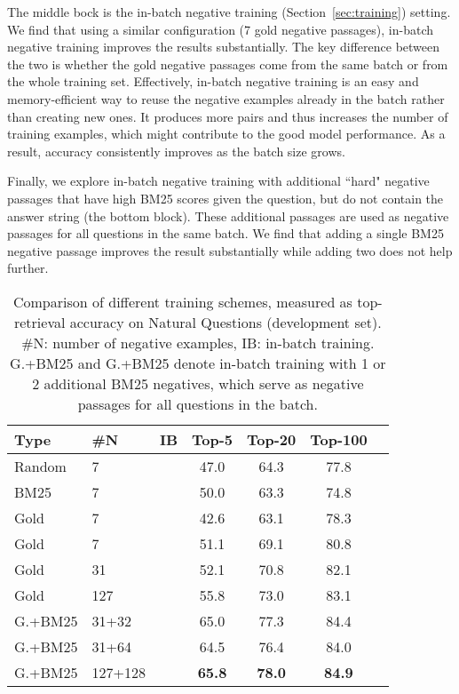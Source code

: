 \documentclass[11pt,a4paper]{article}
\newcommand\tf[1]{\textbf{#1}}
\begin{document}
The middle bock is the in-batch negative training (Section~\ref{sec:training}) setting.
We find that using a similar configuration (7 gold negative passages), in-batch negative training improves the results substantially.
The key difference between the two is whether the gold negative passages come from the same batch or from the whole training set.
Effectively, in-batch negative training is an easy and memory-efficient way to reuse the negative examples already in the batch rather than creating new ones.
It produces more pairs and thus increases the number of training examples, which might contribute to the good model performance. 
As a result, accuracy consistently improves as the batch size grows.

Finally, we explore in-batch negative training with additional ``hard" negative passages that have high BM25 scores given the question, but do not contain the answer string (the bottom block). These additional passages are used as negative passages for all questions in the same batch.
We find that adding a single BM25 negative passage improves the result substantially while adding two does not help further.


\begin{table}[t]
    \centering
    \small
    \begingroup
    \setlength{\tabcolsep}{0.70\tabcolsep}
    \begin{tabular}{@{}l l c cc c c @{}} \toprule
    \tf{Type} & \tf{\#N} & \tf{IB} & \tf{Top-5} & \tf{Top-20} & \tf{Top-100} \\ \midrule
    Random & 7 &  & 47.0 & 64.3 & 77.8 \\
    BM25 & 7 &  & 50.0 & 63.3 & 74.8\\
    Gold & 7 &  & 42.6 & 63.1 & 78.3\\
    \midrule
    Gold & 7 &  & 51.1 & 69.1 & 80.8 \\
    Gold & 31 &  & 52.1 & 70.8 & 82.1 \\
    Gold & 127 &  & 55.8 & 73.0 & 83.1\\
    \midrule
    G.+BM25 & 31+32 &  & 65.0 & 77.3 & 84.4 \\
    {G.+BM25} & 31+64 &  & 64.5 & 76.4 & 84.0 \\
    G.+BM25 & 127+128 &  & \tf{65.8} & \tf{78.0} & \tf{84.9} \\
    \bottomrule
    \end{tabular}
    \endgroup
    \caption{Comparison of different training schemes, measured as top- retrieval accuracy on Natural Questions (development set).  \#N: number of negative examples, IB: in-batch training. G.+BM25 and {G.+BM25} denote in-batch training with 1 or 2 additional BM25 negatives, which serve as negative passages for all questions in the batch.} 
    
    


    \label{tab:ir-ablation}
\end{table}
 
\end{document}

